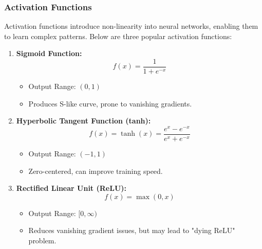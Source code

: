 \documentclass[aspectratio=169]{beamer}
\begin{document}
\begin{frame}[fragile]
  \frametitle{Activation Functions}

  Activation functions introduce non-linearity into neural networks, enabling them to learn complex patterns. Below are three popular activation functions:

  \begin{enumerate}
    \item \textbf{Sigmoid Function:}
      \begin{equation}
        f(x) = \frac{1}{1 + e^{-x}} 
      \end{equation}
      \begin{itemize}
        \item Output Range: $(0, 1)$
        \item Produces S-like curve, prone to vanishing gradients.
      \end{itemize}

    \item \textbf{Hyperbolic Tangent Function (tanh):}
      \begin{equation}
        f(x) = \tanh(x) = \frac{e^x - e^{-x}}{e^x + e^{-x}} 
      \end{equation}
      \begin{itemize}
        \item Output Range: $(-1, 1)$
        \item Zero-centered, can improve training speed.
      \end{itemize}

    \item \textbf{Rectified Linear Unit (ReLU):}
      \begin{equation}
        f(x) = \max(0, x) 
      \end{equation}
      \begin{itemize}
        \item Output Range: $[0, \infty)$
        \item Reduces vanishing gradient issues, but may lead to "dying ReLU" problem.
      \end{itemize}
  \end{enumerate}
\end{frame}
\end{document}
